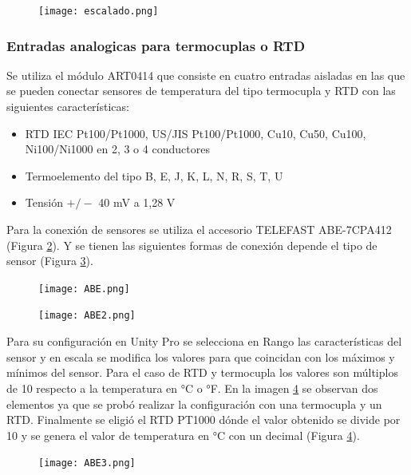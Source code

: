\begin{figure}[H]
	\centering
	\texttt{[image: escalado.png]}
	\label{fig:escalado}
\end{figure}


\subsubsection{Entradas analogicas para termocuplas o RTD}
Se utiliza el módulo ART0414 que consiste en cuatro entradas aisladas en las que se pueden conectar sensores de temperatura del tipo termocupla y RTD con las siguientes características:
\begin{itemize}
	\item RTD IEC Pt100/Pt1000, US/JIS Pt100/Pt1000, Cu10, Cu50, Cu100, Ni100/Ni1000 en 2, 3 o 4 conductores
	\item Termoelemento del tipo B, E, J, K, L, N, R, S, T, U
\item 	Tensión $+/-$ 40 mV a 1,28 V
	
\end{itemize}

Para la conexión de sensores se utiliza el accesorio TELEFAST ABE-7CPA412 (Figura \ref{fig:ABE}). Y se tienen las siguientes formas de conexión depende el tipo de sensor (Figura \ref{fig:ABE2}).

\begin{figure}[H]
	\centering
	\texttt{[image: ABE.png]}
	\label{fig:ABE}
\end{figure}
\begin{figure}[H]
	\centering
	\texttt{[image: ABE2.png]}
	\label{fig:ABE2}
\end{figure}

Para su configuración en Unity Pro se selecciona en Rango las características del sensor y en escala se modifica los valores para que coincidan con los máximos y mínimos del sensor. Para el caso de RTD y termocupla los valores son múltiplos de 10 respecto a la temperatura en °C o °F. 
En la imagen \ref{fig:ABE3} se observan dos elementos ya que se probó realizar la configuración con una termocupla y un RTD. Finalmente se eligió el RTD PT1000 dónde el valor obtenido se divide por 10 y se genera el valor de temperatura en °C con un decimal  (Figura \ref{fig:ABE3}).

\begin{figure}[H]
	\centering
	\texttt{[image: ABE3.png]}
	\label{fig:ABE3}
\end{figure}

